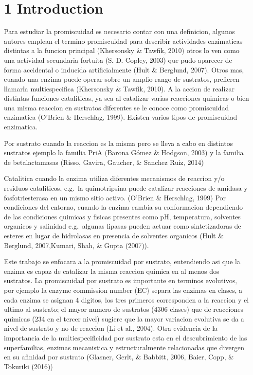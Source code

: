 \documentclass[12pt,twoside]{reedthesis}
\begin{document}
  \section{1 Introduction}\label{introduction}
  
  Para estudiar la promiscuidad es necesario contar con una definicion,
  algunos autores emplean el termino promiscuidad para describir
  actividades enzimaticas distintas a la funcion principal (Khersonsky \&
  Tawfik, 2010) otros lo ven como una actividad secundaria fortuita (S. D.
  Copley, 2003) que pudo aparecer de forma accidental o inducida
  artificialmente (Hult \& Berglund, 2007). Otros mas, cuando una enzima
  puede operar sobre un amplio rango de sustratos, prefieren llamarla
  multiespecifica (Khersonsky \& Tawfik, 2010). A la accion de realizar
  distintas funciones cataliticas, ya sea al catalizar varias reacciones
  quimicas o bien una misma reaccion en sustratos diferentes se le conoce
  como promiscuidad enzimatica (O'Brien \& Herschlag, 1999). Existen
  varios tipos de promiscuidad enzimatica.
  
  Por sustrato cuando la reaccion es la misma pero se lleva a cabo en
  distintos sustratos ejemplo la familia PriA (Barona Gómez \& Hodgson,
  2003) y la familia de betalactamasas (Risso, Gavira, Gaucher, \& Sanchez
  Ruiz, 2014)
  
  Catalitica cuando la enzima utiliza diferentes mecanismos de reaccion
  y/o residuos cataliticos, e.g.~la quimotripsina puede catalizar
  reacciones de amidasa y fosfotriesterasa en un mismo sitio activo.
  (O'Brien \& Herschlag, 1999) Por condiciones del entorno, cuando la
  enzima cambia su conformacion dependiendo de las condiciones quimicas y
  fisicas presentes como pH, temperatura, solventes organicos y salinidad
  e.g.~algunas lipasas pueden actuar como sintetizadoras de esteres en
  lugar de hidrolasas en presencia de solventes organicos (Hult \&
  Berglund, 2007,Kumari, Shah, \& Gupta (2007)).
  
  Este trabajo se enfocara a la promiscuidad por sustrato, entendiendo asi
  que la enzima es capaz de catalizar la misma reaccion quimica en al
  menos dos sustratos. La promiscuidad por sustrato es importante en
  terminos evolutivos, por ejemplo la enzyme commission number (EC) separa
  las enzimas en clases, a cada enzima se asignan 4 digitos, los tres
  primeros corresponden a la reaccion y el ultimo al sustrato; el mayor
  numero de sustratos (4306 clases) que de reacciones quimicas (234 en el
  tercer nivel) sugiere que la mayor variacion evolutiva se da a nivel de
  sustrato y no de reaccion (Li et al., 2004). Otra evidencia de la
  importancia de la multiespecificidad por sustrato esta en el
  descubrimiento de las superfamilias, enzimas mecanistica y
  estructuralmente relacionadas que divergen en su afinidad por sustrato
  (Glasner, Gerlt, \& Babbitt, 2006, Baier, Copp, \& Tokuriki (2016))
  
\end{document}
